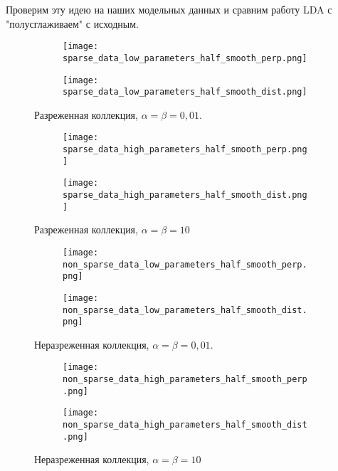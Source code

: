 \documentclass[12pt]{article}
\begin{document}
Проверим эту идею на наших модельных данных и сравним работу LDA с "полусглаживаем" с исходным.

\begin{figure}[hbtp]
  \centering
  \begin{subfigure}[b]{0.49\textwidth}
    \centering
    \texttt{[image: sparse\_data\_low\_parameters\_half\_smooth\_perp.png]}
  \end{subfigure}
  \begin{subfigure}[b]{0.49\textwidth}
    \centering
    \texttt{[image: sparse\_data\_low\_parameters\_half\_smooth\_dist.png]}
  \end{subfigure}
  \caption{Разреженная коллекция, $ \alpha = \beta = 0,01 $.}
  \label{fig:sparse_data_low_parameters_half_smooth}
\end{figure}

\begin{figure}[hbtp]
  \centering
  \begin{subfigure}[b]{0.49\textwidth}
    \centering
    \texttt{[image: sparse\_data\_high\_parameters\_half\_smooth\_perp.png]}
  \end{subfigure}
  \begin{subfigure}[b]{0.49\textwidth}
    \centering
    \texttt{[image: sparse\_data\_high\_parameters\_half\_smooth\_dist.png]}
  \end{subfigure}
  \caption{Разреженная коллекция, $ \alpha = \beta = 10 $}
  \label{fig:sparse_data_high_parameters_half_smooth}
\end{figure}

\begin{figure}[p]
  \centering
  \begin{subfigure}[b]{0.49\textwidth}
    \centering
    \texttt{[image: non\_sparse\_data\_low\_parameters\_half\_smooth\_perp.png]}
  \end{subfigure}
  \begin{subfigure}[b]{0.49\textwidth}
    \centering
    \texttt{[image: non\_sparse\_data\_low\_parameters\_half\_smooth\_dist.png]}
  \end{subfigure}
  \caption{Неразреженная коллекция, $ \alpha = \beta = 0,01 $.}
  \label{fig:non_sparse_data_low_parameters_half_smooth}
\end{figure}

\begin{figure}[hbtp]
  \centering
  \begin{subfigure}[b]{0.49\textwidth}
    \centering
    \texttt{[image: non\_sparse\_data\_high\_parameters\_half\_smooth\_perp.png]}
  \end{subfigure}
  \begin{subfigure}[b]{0.49\textwidth}
    \centering
    \texttt{[image: non\_sparse\_data\_high\_parameters\_half\_smooth\_dist.png]}
  \end{subfigure}
  \caption{Неразреженная коллекция, $ \alpha = \beta = 10 $}
  \label{fig:non_sparse_data_high_parameters_half_smooth}
\end{figure}
\end{document}
